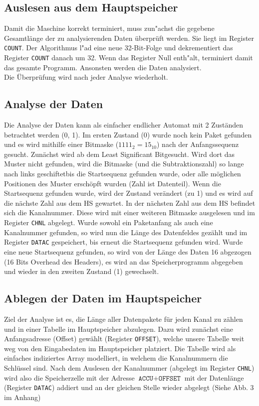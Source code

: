 \documentclass[12pt,titlepage]{article}
\begin{document}
\subsection{Auslesen aus dem Hauptspeicher}
Damit die Maschine korrekt terminiert, muss zun{"a}chst die gegebene Gesamtlänge der zu analysierenden Daten überprüft werden. Sie liegt im Register \texttt{COUNT}.
Der Algorithmus l{"a}d eine neue 32-Bit-Folge und dekrementiert das Register \texttt{COUNT} danach um 32. Wenn das Register Null enth{"a}lt, terminiert damit das gesamte Programm. Ansonsten werden die Daten analysiert.\\
Die Überprüfung wird nach jeder Analyse wiederholt.

 

\subsection{Analyse der Daten}
Die Analyse der Daten kann als einfacher endlicher Automat mit 2 Zuständen betrachtet werden (0, 1). Im ersten Zustand (0)
wurde noch kein Paket gefunden und es wird mithilfe einer Bitmaske ($1111_{2} = 15_{10}$) nach der Anfangssequenz gesucht. 
Zunächst wird ab dem \dq Least Significant Bit\dq gesucht. Wird dort das Muster nicht gefunden, wird die Bitmaske (und die
Subtraktionszahl) so lange nach links \dq geschiftet\dq bis die Startsequenz gefunden wurde, oder
alle möglichen Positionen des Muster erschöpft wurden (Zahl ist Datenteil).
Wenn die Startsequenz gefunden wurde, wird der Zustand verändert (zu 1) und es wird auf die nächste Zahl aus dem HS gewartet. 
In der nächsten Zahl aus dem HS befindet sich die Kanalnummer. Diese wird mit einer weiteren Bitmaske ausgelesen
und im Register \texttt{CHNL} abgelegt.
Wurde sowohl ein Paketanfang als auch eine Kanalnummer gefunden, so wird nun die Länge des Datenfeldes gezählt und im Register \texttt{DATAC} gespeichert, bis erneut die Startsequenz gefunden wird.
Wurde eine neue Startsequenz gefunden, so wird von der Länge des Daten 16 abgezogen (16 Bits Overhead des Headers), 
es wird an das Speicherprogramm abgegeben und wieder in den zweiten Zustand (1) gewechselt.

\subsection{Ablegen der Daten im Hauptspeicher}
Ziel der Analyse ist es, die Länge aller Datenpakete für jeden Kanal zu z{\"a}hlen und in einer Tabelle im Hauptspeicher abzulegen.
Dazu wird zunächst eine Anfangsadresse (Offset) gewählt (Register \texttt{OFFSET}), welche unsere Tabelle weit weg von den Eingabedaten
im Hauptspeicher platziert. Die Tabelle wird als einfaches indiziertes Array modelliert, in welchem die Kanalnummern die
Schlüssel sind. Nach dem Auslesen der Kanalnummer (abgelegt im Register \texttt{CHNL}) wird also die Speicherzelle mit der Adresse 
$\texttt{ACCU} + \texttt{OFFSET}$ mit der Datenlänge (Register \texttt{DATAC}) addiert und an der gleichen Stelle wieder abgelegt (Siehe
Abb. 3 im Anhang)
\end{document}
